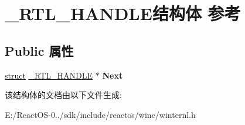 \hypertarget{struct___r_t_l___h_a_n_d_l_e}{}\section{\+\_\+\+R\+T\+L\+\_\+\+H\+A\+N\+D\+L\+E结构体 参考}
\label{struct___r_t_l___h_a_n_d_l_e}
\subsection*{Public 属性}
\begin{DoxyCompactItemize}
\item 
\mbox{\label{struct___r_t_l___h_a_n_d_l_e_a29c08e6904495c95437414d101833d0f}} 
\hyperlink{interfacestruct}{struct} \hyperlink{struct___r_t_l___h_a_n_d_l_e}{\+\_\+\+R\+T\+L\+\_\+\+H\+A\+N\+D\+LE} $\ast$ {\bfseries Next}
\end{DoxyCompactItemize}


该结构体的文档由以下文件生成\+:\begin{DoxyCompactItemize}
\item 
E\+:/\+React\+O\+S-\/0../sdk/include/reactos/wine/winternl.\+h\end{DoxyCompactItemize}
